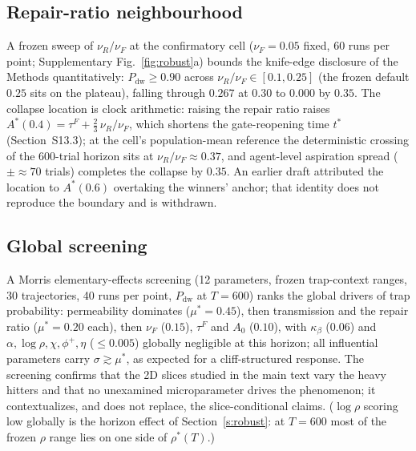 \documentclass[11pt]{article}
\newcommand{\1}{\mathbf{1}}
\newcommand{\Astar}{A^{*}}
\begin{document}
\subsection{Repair-ratio neighbourhood}
A frozen sweep of $\nu_R/\nu_F$ at the confirmatory cell ($\nu_F=0.05$ fixed, 60 runs per
point; Supplementary Fig.~\ref{fig:robust}a) bounds the knife-edge disclosure of the
Methods quantitatively: $P_{\mathrm{dw}}\ge0.90$ across $\nu_R/\nu_F\in[0.1,0.25]$
(the frozen default $0.25$ sits on the plateau), falling through $0.267$ at $0.30$ to
$0.000$ by $0.35$. The collapse location is clock arithmetic: raising the repair ratio raises $\Astar(0.4)=\tau^F+\tfrac{2}{3}\,\nu_R/\nu_F$, which shortens the gate-reopening time $t^{*}$ (Section~S13.3); at the cell's population-mean reference the deterministic crossing of the 600-trial horizon sits at $\nu_R/\nu_F\approx0.37$, and agent-level aspiration spread ($\pm\approx70$ trials) completes the collapse by $0.35$. An earlier draft attributed the location to $\Astar(0.6)$ overtaking the winners' anchor; that identity does not reproduce the boundary and is withdrawn.

\subsection{Global screening}
A Morris elementary-effects screening (12 parameters, frozen trap-context ranges, 30
trajectories, 40 runs per point, $P_{\mathrm{dw}}$ at $T=600$) ranks the global drivers of
trap probability: permeability dominates ($\mu^*=0.45$), then transmission and the repair
ratio ($\mu^*=0.20$ each), then $\nu_F$ ($0.15$), $\tau^F$ and $A_0$ ($0.10$), with
$\kappa_\beta$ ($0.06$) and $\alpha,\log\rho,\chi,\phi^+,\eta$ ($\le0.005$) globally
negligible at this horizon; all influential parameters carry $\sigma\gtrsim\mu^*$,
as expected for a cliff-structured response. The screening confirms that the 2D slices
studied in the main text vary the heavy hitters and that no unexamined microparameter
drives the phenomenon; it contextualizes, and does not replace, the slice-conditional
claims. ($\log\rho$ scoring low globally is the horizon effect of
Section~\ref{s:robust}: at $T=600$ most of the frozen $\rho$ range lies on one side of
$\rho^*(T)$.)
\end{document}
